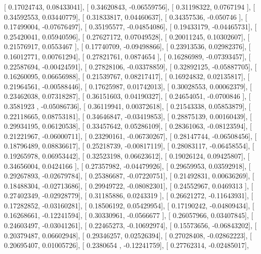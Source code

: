 \documentclass{article}
\begin{document}
       [ 0.17024743,  0.08433041],
       [ 0.34620843, -0.06559756],
       [ 0.31198322,  0.0767194 ],
       [ 0.34592553,  0.03440779],
       [ 0.31833817,  0.04460637],
       [ 0.34357536, -0.050746  ],
       [ 0.17499004, -0.07676497],
       [ 0.35195577, -0.04854086],
       [ 0.19433179, -0.04465731],
       [ 0.25420041,  0.05940596],
       [ 0.27627172,  0.07049528],
       [ 0.20011245,  0.10302607],
       [ 0.21576917,  0.0553467 ],
       [ 0.17740709, -0.09498866],
       [ 0.23913536,  0.02982376],
       [ 0.16012771,  0.00761294],
       [ 0.27821761,  0.0874654 ],
       [ 0.16286989, -0.07393457],
       [ 0.22587694, -0.00424591],
       [ 0.27828106, -0.03378859],
       [ 0.32892125, -0.05887705],
       [ 0.16260095,  0.06656988],
       [ 0.21539767,  0.08217417],
       [ 0.16924832,  0.02135817],
       [ 0.21964561, -0.00588446],
       [ 0.17625987,  0.01742013],
       [ 0.30028553,  0.00062379],
       [ 0.23462038,  0.07318287],
       [ 0.36151603,  0.04190327],
       [ 0.24654051, -0.0700846 ],
       [ 0.3581923 , -0.05086736],
       [ 0.36119941,  0.00372618],
       [ 0.21543338,  0.05853879],
       [ 0.22118665,  0.08753181],
       [ 0.34646847, -0.03419853],
       [ 0.28875139,  0.00160439],
       [ 0.29934195,  0.06120538],
       [ 0.33457642,  0.05286109],
       [ 0.28361063, -0.08123594],
       [ 0.21221967, -0.06000711],
       [ 0.23290161, -0.06730267],
       [ 0.28147744, -0.06508456],
       [ 0.18796489,  0.08836617],
       [ 0.25218739, -0.00817119],
       [ 0.28083117, -0.06458554],
       [ 0.19265978,  0.06953442],
       [ 0.32523198,  0.06623612],
       [ 0.19026124,  0.09425807],
       [ 0.34656004,  0.0424166 ],
       [ 0.27357982, -0.04479926],
       [ 0.29659953,  0.03592918],
       [ 0.29267893, -0.02679784],
       [ 0.25386687, -0.07220751],
       [ 0.21492831,  0.00636269],
       [ 0.18488304, -0.02713686],
       [ 0.29949722, -0.08082301],
       [ 0.24552967,  0.0469313 ],
       [ 0.27402349, -0.02928779],
       [ 0.31185886,  0.0243319 ],
       [ 0.26621272, -0.11643931],
       [ 0.17282852, -0.03160281],
       [ 0.18506192,  0.05429954],
       [ 0.17190242, -0.04809434],
       [ 0.16268661, -0.12241594],
       [ 0.30330961, -0.0566677 ],
       [ 0.26057966,  0.03407845],
       [ 0.24603497, -0.03041261],
       [ 0.22465273, -0.10692974],
       [ 0.15573656, -0.06843202],
       [ 0.20379487,  0.06602948],
       [ 0.29346257,  0.02526394],
       [ 0.27028408, -0.02862223],
       [ 0.20695407,  0.01005726],
       [ 0.2380654 , -0.12241759],
       [ 0.27762314, -0.02485017],
\end{document}
